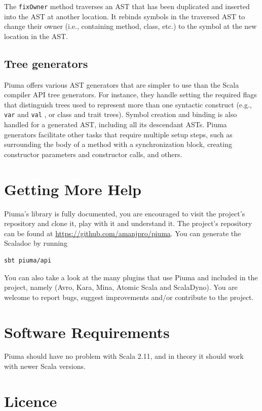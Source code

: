 \documentclass{article}
\renewcommand\c[1]{
  \ifmmode
    \text{#1}
  \else
    \lstinline{#1}
  \fi
}
\begin{document}
The \c{fixOwner} method traverses an AST that has been duplicated and inserted
into the AST at another location. It rebinds symbols in the traversed AST to
change their owner (i.e., containing method, class, etc.) to the symbol at the
new location in the AST.

\subsection{Tree generators}

Piuma offers various AST generators that are simpler to use than the Scala
compiler API tree generators.  For instance, they handle setting the required
flags that distinguish trees used to represent more than one syntactic
construct (e.g., \c{var} and \c{val}, or class and trait trees). Symbol
creation and binding is also handled for a generated AST, including all its
descendant ASTs.  Piuma generators facilitate other tasks that require
multiple setup steps, such as surrounding the body of a method with a
synchronization block, creating constructor parameters and constructor calls,
and others. 

\section{Getting More Help}
Piuma's library is fully documented, you are encouraged to visit the
project's repository and clone it, play with it and understand it.  The
project's repository can be found at
\url{https://github.com/amanjpro/piuma}. You can generate the Scaladoc by
running

\begin{verbatim}
sbt piuma/api
\end{verbatim}

You can also take a look at the many plugins that use Piuma and included in
the project, namely (Avro, Kara, Mina, Atomic Scala and ScalaDyno). You are
welcome to report bugs, suggest improvements and/or contribute to the project.


\section{Software Requirements}
Piuma should have no problem with Scala 2.11, and in theory it should work 
with newer Scala versions.


\section{Licence}
\end{document}
